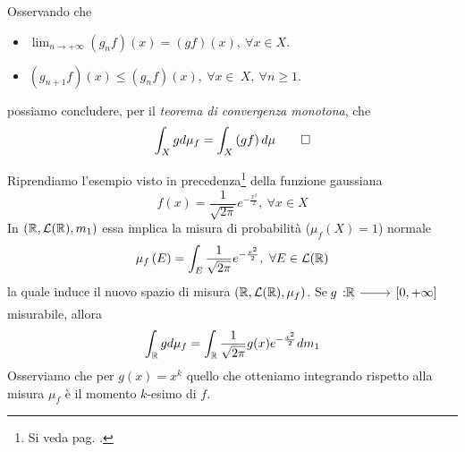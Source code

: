 \begin{demonstration}
\begin{enumerate}[label=\Roman*]
\begin{equation*}
	\end{equation*}
Osservando che
\begin{itemize}
	\item $\displaystyle\lim_{n\to+\infty}\left(g_nf\right)(x)=\left(gf\right)(x),\ \forall x\in X$.
	\item $\left(g_{n+1}f\right)(x)\leq \left(g_nf\right)(x),\ \forall x\in\ X,\ \forall n\geq 1$.
\end{itemize}
possiamo concludere, per il \textit{teorema di convergenza monotona}, che
\begin{equation*}
	\int_Xgd\mu_f=\int_X\left(gf\right)d\mu\qedhere
\end{equation*}
	\end{enumerate}
\end{demonstration}
\begin{example}
	Riprendiamo l'esempio visto in precedenza\footnote{Si veda pag. \pageref{gaussiana}.} della funzione gaussiana
	\begin{equation*}
		f(x)=\frac{1}{\sqrt{2\pi}}e^{-\frac{x^2}{2}},\ \forall x\in X
	\end{equation*}
	In $\left(\mathbb{R},\mathcal{L}(\mathbb{R}),m_1\right)$ essa implica la misura di probabilità ($\mu_f(X)=1$) normale
	\begin{equation*}
		\mu_f\left(E\right)=\int_E\frac{1}{\sqrt{2\pi}}e^{-\frac{x^2}{2}},\ \forall E\in \mathcal{L}(\realset)
	\end{equation*}
la quale induce il nuovo spazio di misura $\left(\mathbb{R},\mathcal{L}(\mathbb{R}),\mu_f\right)$. Se $\funz{g}{\realset}{\left[0,+\infty\right]}$ misurabile, allora
\begin{equation*}
	\int_{\mathbb{R}} gd\mu_f=\int_{\mathbb{R}}\frac{1}{\sqrt{2\pi}}g(x)e^{-\frac{x^2}{2}}dm_1
\end{equation*}
Osserviamo che per $g(x)=x^k$ quello che otteniamo integrando rispetto alla misura $\mu_f$ è il momento $k$-esimo di $f$.
\end{example}
